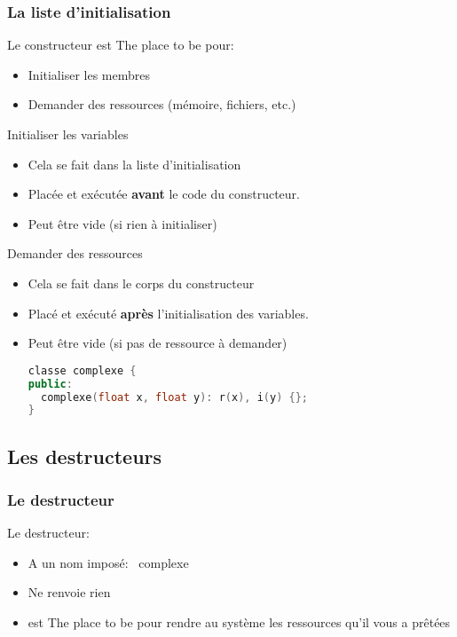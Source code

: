 \documentclass{beamer}
\begin{document}
\begin{frame}[fragile=singleslide,shrink=20]
\frametitle {La liste d'initialisation}
Le constructeur est The place to be pour:
\begin{itemize}
\item{Initialiser les membres}
\item{Demander des ressources (mémoire, fichiers, etc.)}
\end{itemize}

\begin{block}{Initialiser les variables}
\begin{itemize}
\item{Cela se fait dans la liste d'initialisation}
\item{Placée et exécutée \textbf{avant} le code du constructeur.}
\item{Peut être vide (si rien à initialiser)}
\end{itemize}
\end{block}

\begin{block}{Demander des ressources}
\begin{itemize}
\item{Cela se fait dans le corps du constructeur}
\item{Placé et exécuté \textbf{après} l'initialisation des variables.}
\item{Peut être vide (si pas de ressource à demander)}
\begin{lstlisting}[language=c++]
classe complexe {
public:
  complexe(float x, float y): r(x), i(y) {};
}
\end{lstlisting}
\end{itemize}
\end{block}
\end{frame}

\subsection{Les destructeurs}
\begin{frame}[fragile=singleslide,shrink=20]
\frametitle {Le destructeur}
Le destructeur:
\begin{itemize}
\item{A un nom imposé: ~complexe}
\item{Ne renvoie rien}
\item{est The place to be pour rendre au système les ressources qu'il vous a prêtées}
\end{itemize}
\end{frame}
\end{document}
